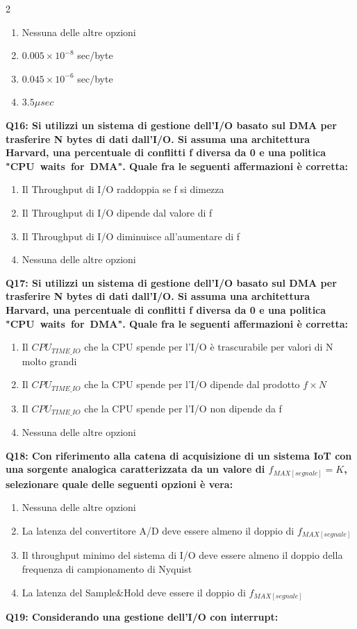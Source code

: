 \documentclass[10pt]{article}
\begin{document}
\begin{multicols}{2}
\begin{enumerate}[label=\arabic*.]
\item Nessuna delle altre opzioni
\item $0.005\times10^{-8}$ sec/byte
\item $0.045\times10^{-6}$ sec/byte
\item $3.5 \mu sec$
\end{enumerate}
\textbf{Q16: Si utilizzi un sistema di gestione dell’I/O basato sul DMA per trasferire N bytes di dati dall’I/O. Si assuma una architettura Harvard, una percentuale di conflitti f diversa da 0 e una politica "CPU waits for DMA". Quale fra le seguenti affermazioni è corretta:}

\begin{enumerate}[label=\arabic*.]
\item Il Throughput di I/O raddoppia se f si dimezza
\item Il Throughput di I/O dipende dal valore di f
\item Il Throughput di I/O diminuisce all’aumentare di f
\item Nessuna delle altre opzioni
\end{enumerate}
\textbf{Q17: Si utilizzi un sistema di gestione dell’I/O basato sul DMA per trasferire N bytes di dati dall’I/O. Si assuma una architettura Harvard, una percentuale di conflitti f diversa da 0 e una politica "CPU waits for DMA". Quale fra le seguenti affermazioni è corretta:}

\begin{enumerate}[label=\arabic*.]
\item Il $CPU_{TIME\_IO}$ che la CPU spende per l’I/O è trascurabile per valori di N molto grandi
\item Il $CPU_{TIME\_IO}$ che la CPU spende per l’I/O dipende dal prodotto $f \times N$
\item Il $CPU_{TIME\_IO}$ che la CPU spende per l’I/O non dipende da f
\item Nessuna delle altre opzioni
\end{enumerate}
\textbf{Q18: Con riferimento alla catena di acquisizione di un sistema IoT con una sorgente analogica caratterizzata da un valore di $f_{MAX[segnale]} = K$, selezionare quale delle seguenti opzioni è vera:}

\begin{enumerate}[label=\arabic*.]
\item Nessuna delle altre opzioni
\item La latenza del convertitore A/D deve essere almeno il doppio di $f_{MAX[segnale]}$
\item Il throughput minimo del sistema di I/O deve essere almeno il doppio della frequenza di campionamento di Nyquist
\item La latenza del Sample\&Hold deve essere il doppio di $f_{MAX[segnale]}$
\end{enumerate}
\textbf{Q19: Considerando una gestione dell’I/O con interrupt:}


\end{multicols}
\end{document}
